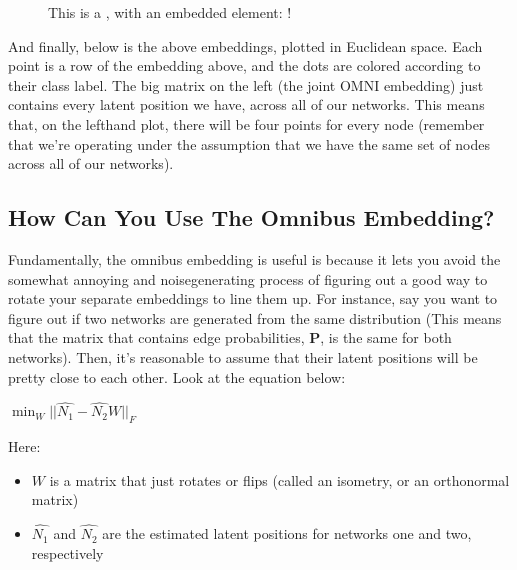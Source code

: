 \documentclass[letterpaper,10pt,english]{jupyterBook}
\begin{document}
\noindent{}

\begin{figure}[htbp]
\centering
\capstart

\noindent{}
\caption{This is a , with an embedded  element: !}\label{\detokenize{representations/ch6/multigraph-representation-learning:fig-omnibus}}\end{figure}

\sphinxAtStartPar
And finally, below is the above embeddings, plotted in Euclidean space. Each point is a row of the embedding above, and the dots are colored according to their class label. The big matrix on the left (the joint OMNI embedding) just contains every latent position we have, across all of our networks. This means that, on the lefthand plot, there will be four points for every node (remember that we’re operating under the assumption that we have the same set of nodes across all of our networks).

\noindent{}


\subsection{How Can You Use The Omnibus Embedding?}
\label{\detokenize{representations/ch6/multigraph-representation-learning:how-can-you-use-the-omnibus-embedding}}
\sphinxAtStartPar
Fundamentally, the omnibus embedding is useful is because it lets you avoid the somewhat annoying and noise\sphinxhyphen{}generating process of figuring out a good way to rotate your separate embeddings to line them up. For instance, say you want to figure out if two networks are generated from the same distribution (This means that the matrix that contains edge probabilities, \(\textbf{P}\), is the same for both networks). Then, it’s reasonable to assume that their latent positions will be pretty close to each other. Look at the equation below:

\sphinxAtStartPar
\(\min_{W} ||{\hat{N_1} - \hat{N_2}W}||_F\)

\sphinxAtStartPar
Here:
\begin{itemize}
\item {} 
\sphinxAtStartPar
\(W\) is a matrix that just rotates or flips (called an isometry, or an orthonormal matrix)

\item {} 
\sphinxAtStartPar
\(\hat{N_1}\) and \(\hat{N_2}\) are the estimated latent positions for networks one and two, respectively

\end{itemize}
\end{document}
